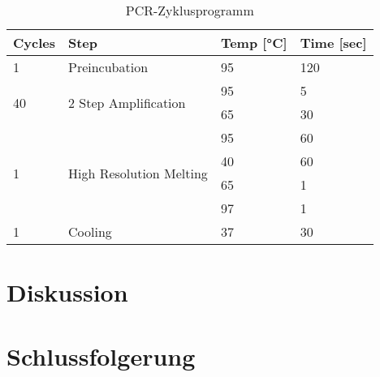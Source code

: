 \documentclass{article}
\begin{document}
\begin{table}[H]
    \centering
    \begin{tabular}{|l|l|l|l|}
    \hline
    \textbf{Cycles} & \textbf{Step} & \textbf{Temp [°C]} & \textbf{Time [sec]} \\ \hline
    1 & Preincubation & 95 & 120 \\ \hline
    \multirow{2}{*}{40} & \multirow{2}{*}{2 Step Amplification} & 95 & 5 \\ \cline{3-4}
     &  & 65 & 30 \\ \hline
    \multirow{4}{*}{1} & \multirow{4}{*}{High Resolution Melting} & 95 & 60 \\ \cline{3-4}
     &  & 40 & 60 \\ \cline{3-4}
     &  & 65 & 1 \\ \cline{3-4}
     &  & 97 & 1 \\ \hline
    1 & Cooling & 37 & 30 \\ \hline
    \end{tabular}
    \caption{PCR-Zyklusprogramm}
    \end{table}
  


\section{Diskussion}

\section{Schlussfolgerung}



\end{document}
